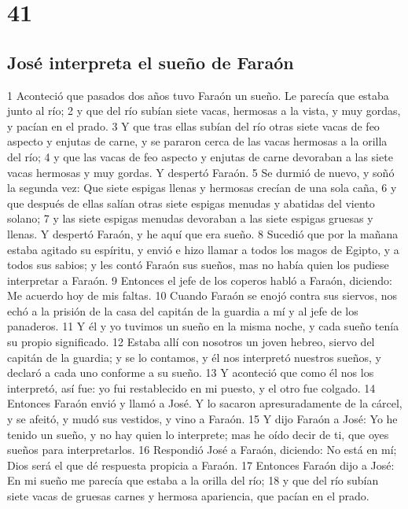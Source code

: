 \chapter{41}

\section{José interpreta el sueño de Faraón}

1 Aconteció que pasados dos años tuvo Faraón un sueño. Le parecía que estaba junto al río;
2 y que del río subían siete vacas, hermosas a la vista, y muy gordas, y pacían en el prado.
3 Y que tras ellas subían del río otras siete vacas de feo aspecto y enjutas de carne, y se pararon cerca de las vacas hermosas a la orilla del río;
4 y que las vacas de feo aspecto y enjutas de carne devoraban a las siete vacas hermosas y muy gordas. Y despertó Faraón.
5 Se durmió de nuevo, y soñó la segunda vez: Que siete espigas llenas y hermosas crecían de una sola caña,
6 y que después de ellas salían otras siete espigas menudas y abatidas del viento solano;
7 y las siete espigas menudas devoraban a las siete espigas gruesas y llenas. Y despertó Faraón, y he aquí que era sueño.
8 Sucedió que por la mañana estaba agitado su espíritu, y envió e hizo llamar a todos los magos de Egipto, y a todos sus sabios; y les contó Faraón sus sueños, mas no había quien los pudiese interpretar a Faraón.
9 Entonces el jefe de los coperos habló a Faraón, diciendo: Me acuerdo hoy de mis faltas.
10 Cuando Faraón se enojó contra sus siervos, nos echó a la prisión de la casa del capitán de la guardia a mí y al jefe de los panaderos.
11 Y él y yo tuvimos un sueño en la misma noche, y cada sueño tenía su propio significado.
12 Estaba allí con nosotros un joven hebreo, siervo del capitán de la guardia; y se lo contamos, y él nos interpretó nuestros sueños, y declaró a cada uno conforme a su sueño.
13 Y aconteció que como él nos los interpretó, así fue: yo fui restablecido en mi puesto, y el otro fue colgado.
14 Entonces Faraón envió y llamó a José. Y lo sacaron apresuradamente de la cárcel, y se afeitó, y mudó sus vestidos, y vino a Faraón.
15 Y dijo Faraón a José: Yo he tenido un sueño, y no hay quien lo interprete; mas he oído decir de ti, que oyes sueños para interpretarlos.
16 Respondió José a Faraón, diciendo: No está en mí; Dios será el que dé respuesta propicia a Faraón.
17 Entonces Faraón dijo a José: En mi sueño me parecía que estaba a la orilla del río;
18 y que del río subían siete vacas de gruesas carnes y hermosa apariencia, que pacían en el prado.
